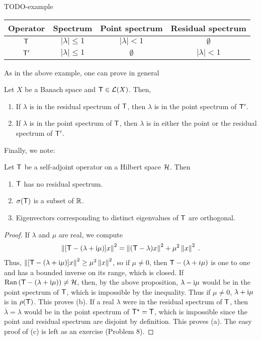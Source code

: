 TODO-example

\begin{table}[H]
    \centering
    \begin{tabular}{c|c|c|c}
        Operator & Spectrum & Point spectrum & Residual spectrum \\
        \hline
        $\mathsf{T}$ & $|\lambda| \leq 1 $ & $|\lambda| < 1$ & $\emptyset$ \\
        $\mathsf{T}'$ & $|\lambda| \leq 1 $ & $\emptyset$ & $|\lambda| < 1$
    \end{tabular}
\end{table}

As in the above example, one can prove in general
\begin{proposition}
    Let $X$ be a Banach space and $\mathsf{T} \in \mathcal L(X)$. Then,
    \begin{enumerate}
        \item If $\lambda$ is in the residual spectrum of $\mathsf{T}$, then $\lambda$ is in the point spectrum of $\mathsf{T}'$.
        \item If $\lambda$ is in the point spectrum of $\mathsf{T}$, then $\lambda$ is in either the point or the residual spectrum of $\mathsf{T}'$.
    \end{enumerate}
\end{proposition}

Finally, we note:

\begin{theorem}
    Let $\mathsf{T}$ be a self-adjoint operator on a Hilbert space $\mathcal{H}$. Then
    \begin{enumerate}
        \item $\mathsf{T}$ has no residual spectrum.
        \item $\sigma(\mathsf{T})$ is a subset of $\mathbb{R}$.
        \item Eigenvectors corresponding to distinct eigenvalues of $\mathsf{T}$ are orthogonal.
    \end{enumerate}
\end{theorem}

\begin{proof}
    If $\lambda$ and $\mu$ are real, we compute \begin{align}
        \left \Vert [\mathsf{T} - (\lambda + \mathrm{i} \mu)] x \right \Vert^2 = \left \Vert (\mathsf{T} - \lambda) x \right \Vert^2 + \mu^2 \left \Vert x \right \Vert^2 \:.
    \end{align}
    Thus, $\left \Vert [\mathsf{T} - (\lambda + \mathrm{i} \mu)] x \right \Vert^2 \geq \mu^2 \left \Vert x \right \Vert^2$, so if $\mu \neq 0$, then $\mathsf{T} - (\lambda + i \mu)$ is one to one and has a bounded inverse on its range, which is closed. If $\mathrm{Ran}\, (\mathsf{T} - (\lambda + \mathrm{i} \mu)) \neq \mathcal{H}$, then, by the above proposition, $\lambda - \mathrm{i} \mu$ would be in the point spectrum of $\mathsf{T}$, which is impossible by the inequality. Thus if $\mu \neq 0$, $\lambda + \mathrm{i} \mu$ is in $\rho(\mathsf{T})$. This proves (b). If a real $\lambda$ were in the residual spectrum of $\mathsf{T}$, then $\overline \lambda = \lambda$ would be in the point spectrum of $\mathsf{T}^\star = \mathsf{T}$, which is impossible since the point and residual spectrum are disjoint by definition. This proves (a). The easy proof of (c) is left as an exercise (Problem 8).
\end{proof}

